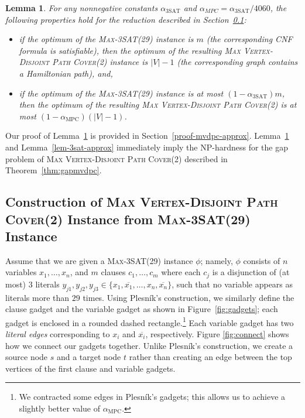\documentclass[11pt]{article}
\newtheorem{lemma}{Lemma}
\def\MPC{\mathrm{MPC}}
\def\SAT{\mathrm{3SAT}}
\begin{document}
\begin{lemma} \label{lem-mvdpc-approx}
For any nonnegative constants $\alpha_{\SAT}$ and $\alpha_{MPC} = \alpha_{\SAT}/4060$, the following properties hold for the reduction described in Section~\ref{plesnik-construct}:
\begin{itemize}
	\item if the optimum of the \textsc{Max-3SAT(29)} instance is $m$ (the corresponding CNF formula is satisfiable), then the optimum of the resulting \textsc{Max Vertex-Disjoint Path Cover(2)} instance is $|V|-1$ (the corresponding graph contains a Hamiltonian path), and,
	\item if the optimum of the \textsc{Max-3SAT(29)} instance is at most $(1-\alpha_{\SAT})m$, then the optimum of the resulting \textsc{Max Vertex-Disjoint Path Cover(2)} is at most $(1-\alpha_{\MPC})(|V|-1)$.
\end{itemize}
\end{lemma}

Our proof of Lemma~\ref{lem-mvdpc-approx} is provided in Section~\ref{proof-mvdpc-approx}.
Lemma~\ref{lem-mvdpc-approx} and Lemma~\ref{lem-3sat-approx} immediately imply the NP-hardness for the gap problem of \textsc{Max Vertex-Disjoint Path Cover(2)} described in Theorem~\ref{thm:gapmvdpc}.

\subsection{Construction of \textsc{Max Vertex-Disjoint Path Cover(2)} Instance from \textsc{Max-3SAT(29)} Instance} \label{plesnik-construct}

Assume that we are given a \textsc{Max-3SAT(29)} instance $\phi$; namely, $\phi$ consists of $n$ variables $x_1, \ldots, x_n$, and $m$ clauses $c_1, \ldots, c_m$ where each $c_j$ is a disjunction of (at most) $3$ literals $y_{j1}, y_{j2}, y_{j3} \in \{x_1, \overline{x_1},\ldots, x_n, \overline{x_n}\}$, such that no variable appears as literals more than $29$ times. Using Plesn{\'i}k's construction, we similarly define the clause gadget and the variable gadget as shown in Figure~\ref{fig:gadgets}; each gadget is enclosed in a rounded dashed rectangle.\footnote{We contracted some edges in Plesn{\'i}k's gadgets; this allows us to achieve a slightly better value of $\alpha_{\MPC}$.} Each variable gadget has two \emph{literal edges} corresponding to $x_i$ and $\overline{x_i}$, respectively. Figure \ref{fig:connect} shows how we connect our gadgets together. Unlike Plesn{\'i}k's construction, we create a source node $s$ and a target node $t$ rather than creating an edge between the top vertices of the first clause and variable gadgets.
\end{document}
